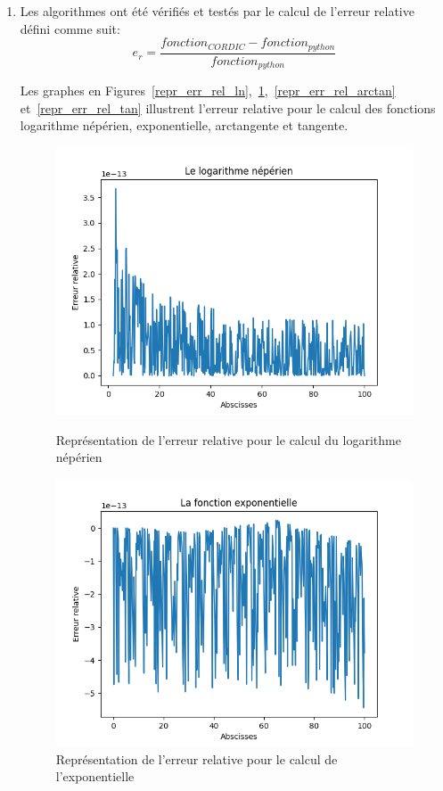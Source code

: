 \documentclass{article}
\begin{document}
\begin{enumerate}
    \item
    Les algorithmes ont été vérifiés et testés par le calcul de l'erreur relative défini comme suit:
    \[e_r = \frac{fonction_{CORDIC} - fonction_{python}}{fonction_{python}}\]
    
    Les graphes en Figures~\ref{repr_err_rel_ln},~\ref{repr_err_rel_exp},~\ref{repr_err_rel_arctan} et~\ref{repr_err_rel_tan} illustrent l'erreur relative pour le calcul des fonctions logarithme népérien, exponentielle, arctangente et tangente.
    
    \begin{figure}[H]
       \begin{minipage}{0.48\textwidth}
         \centering
         \includegraphics[width=1.1\linewidth]{images/er_ln.png}
         \caption{Représentation de l'erreur relative pour le calcul du logarithme népérien}\label{repr_err_rel_ln}
       \end{minipage}\hfill
       \begin{minipage}{0.48\textwidth}
         \centering
         \includegraphics[width=1.1\linewidth]{images/er_exp.png}
         \caption{Représentation de l'erreur relative pour le calcul de l'exponentielle}\label{repr_err_rel_exp}
       \end{minipage}
    \end{figure}
    

\end{enumerate}
\end{document}
